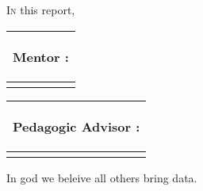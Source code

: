 \begin{resume}

\bigskip

\lettrine[lines=2]{I}n this report,
\end{resume}
\begin{center} 

\begin{Signatures}



 \begin{tabular}{||m{16cm}||} 
 \hline
 \begin{center}
     {Mentor :}
 \end{center}  \\ [0.5ex] 
 \hline\hline
   \\ [5cm] 
 \hline
\end{tabular}




 \begin{tabular}{||m{16cm}||} 
 \hline
 \begin{center}
     {Pedagogic Advisor : }
 \end{center}  \\ [0.5ex] 
 \hline\hline
   \\ [5cm] 
 \hline
\end{tabular}


\end{Signatures}
\end{center}
\begin{acknowledgement}

In god we beleive all others bring data.


\bigskip

\end{acknowledgement}
